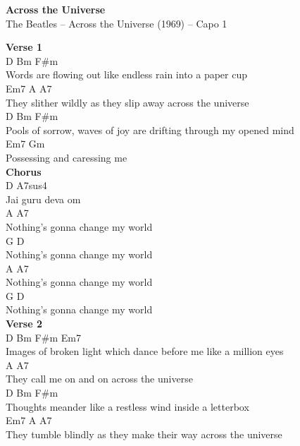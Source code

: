 \documentclass[a4paper]{article}
\begin{document}
    \begin{center}
        \textbf{Across the Universe}
        ~\\
        The Beatles -- Across the Universe (1969)
         -- Capo 1
    \end{center}
    {
        \scriptsize
        \textbf{Verse 1}
        ~\\
        {
            \cutive
            \obeyspaces
D                 Bm               F\#m
\\
Words are flowing out like endless rain into a paper cup
\\
     Em7                          A              A7
\\
They slither wildly as they slip away across the universe
\\
D                Bm               F\#m
\\
Pools of sorrow, waves of joy are drifting through my opened mind
\\
  Em7            Gm
\\
Possessing and caressing me
\\

        }
        \textbf{Chorus}
        ~\\
        {
            \cutive
            \obeyspaces
D             A7sus4
\\
Jai guru deva om
\\
A                         A7
\\
Nothing's gonna change my world
\\
G                         D
\\
Nothing's gonna change my world
\\
A                         A7
\\
Nothing's gonna change my world
\\
G                         D
\\
Nothing's gonna change my world
\\

        }
        \textbf{Verse 2}
        ~\\
        {
            \cutive
            \obeyspaces
D         Bm                 F\#m                            Em7
\\
Images of broken light which dance before me like a million eyes
\\
                        A            A7
\\
They call me on and on across the universe
\\
D                Bm              F\#m
\\
Thoughts meander like a restless wind inside a letterbox
\\
     Em7                               A              A7
\\
They tumble blindly as they make their way across the universe
\\

}}
\end{document}
